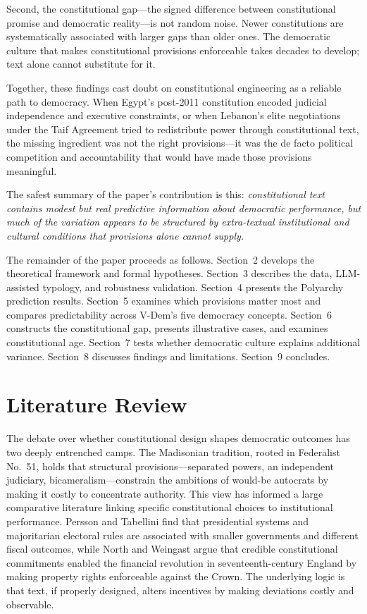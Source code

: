 \documentclass[9pt,twoside]{pnas-new}
\begin{document}
Second, the constitutional gap---the signed difference between constitutional promise and democratic reality---is not random noise. Newer constitutions are systematically associated with larger gaps than older ones. The democratic culture that makes constitutional provisions enforceable takes decades to develop; text alone cannot substitute for it.

Together, these findings cast doubt on constitutional engineering as a reliable path to democracy. When Egypt's post-2011 constitution encoded judicial independence and executive constraints, or when Lebanon's elite negotiations under the Taif Agreement tried to redistribute power through constitutional text, the missing ingredient was not the right provisions---it was the de facto political competition and accountability that would have made those provisions meaningful.

The safest summary of the paper's contribution is this: \textit{constitutional text contains modest but real predictive information about democratic performance, but much of the variation appears to be structured by extra-textual institutional and cultural conditions that provisions alone cannot supply.}

The remainder of the paper proceeds as follows. Section~2 develops the theoretical framework and formal hypotheses. Section~3 describes the data, LLM-assisted typology, and robustness validation. Section~4 presents the Polyarchy prediction results. Section~5 examines which provisions matter most and compares predictability across V-Dem's five democracy concepts. Section~6 constructs the constitutional gap, presents illustrative cases, and examines constitutional age. Section~7 tests whether democratic culture explains additional variance. Section~8 discusses findings and limitations. Section~9 concludes.

\section*{Literature Review}

The debate over whether constitutional design shapes democratic outcomes has two deeply entrenched camps. The Madisonian tradition, rooted in Federalist No.~51, holds that structural provisions---separated powers, an independent judiciary, bicameralism---constrain the ambitions of would-be autocrats by making it costly to concentrate authority. This view has informed a large comparative literature linking specific constitutional choices to institutional performance. Persson and Tabellini \cite{persson_tabellini_2003} find that presidential systems and majoritarian electoral rules are associated with smaller governments and different fiscal outcomes, while North and Weingast \cite{north_weingast_1989} argue that credible constitutional commitments enabled the financial revolution in seventeenth-century England by making property rights enforceable against the Crown. The underlying logic is that text, if properly designed, alters incentives by making deviations costly and observable.
\end{document}
